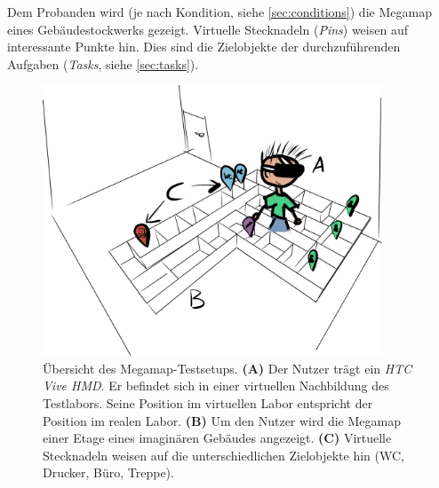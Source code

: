 \documentclass[
    draft=false,
    paper=a4,
    fontsize=11pt,
    twoside=false,
    captions=tableheading,
    british, ngerman,
]{scrartcl}
\begin{document}
Dem Probanden wird (je nach Kondition, siehe \autoref{sec:conditions}) die Megamap eines Gebäudestockwerks gezeigt.
Virtuelle Stecknadeln (\emph{Pins}) weisen auf interessante Punkte hin.
Dies sind die Zielobjekte der durchzuführenden Aufgaben (\emph{Tasks}, siehe \autoref{sec:tasks}).
\begin{figure}[p]
    \centering
    \includegraphics[width=0.9\textwidth]{study_design_setup_reworked}
    \caption{Übersicht des Megamap-Testsetups. %
    \textbf{(A)} Der Nutzer trägt ein \emph{HTC Vive HMD}. %
    Er befindet sich in einer virtuellen Nachbildung des Testlabors. %
    Seine Position im virtuellen Labor entspricht der Position im realen Labor. %
    \textbf{(B)} Um den Nutzer wird die Megamap einer Etage eines imaginären Gebäudes angezeigt. %
    \textbf{(C)} Virtuelle Stecknadeln weisen auf die unterschiedlichen Zielobjekte hin (WC, Drucker, Büro, Treppe).}
    \label{fig:study_design_rework}
\end{figure}

\end{document}
